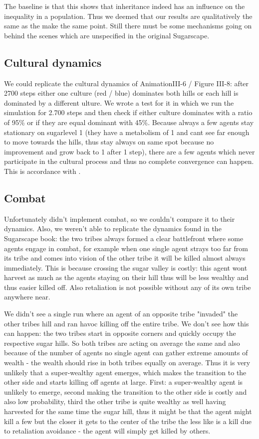 The baseline is that this shows that inheritance indeed has an influence on the inequality in a population. Thus we deemed that our results are qualitatively the same as the make the same point. Still there must be some mechanisms going on behind the scenes which are unspecified in the original Sugarscape.

\subsection{Cultural dynamics}
We could replicate the cultural dynamics of AnimationIII-6 / Figure III-8: after 2700 steps either one culture (red / blue) dominates both hills or each hill is dominated by a different ulture. We wrote a test for it in which we run the simulation for 2.700 steps and then check if either culture dominates with a ratio of 95\% or if they are equal dominant with 45\%. Because always a few agents stay stationary on sugarlevel 1 (they have a metabolism of 1 and cant see far enough to move towards the hills, thus stay always on same spot because no improvement and grow back to 1 after 1 step), there are a few agents which never participate in the cultural process and thus no complete convergence can happen. This is accordance with \cite{weaver_replicating_2009}.

\subsection{Combat}
Unfortunately \cite{weaver_replicating_2009} didn't implement combat, so we couldn't compare it to their dynamics. Also, we weren't able to replicate the dynamics found in the Sugarscape book: the two tribes always formed a clear battlefront where some agents engage in combat, for example when one single agent strays too far from its tribe and comes into vision of the other tribe it will be killed almost always immediately. This is because crossing the sugar valley is costly: this agent wont harvest as much as the agents staying on their hill thus will be less wealthy and thus easier killed off. Also retaliation is not possible without any of its own tribe anywhere near.

We didn't see a single run where an agent of an opposite tribe "invaded" the other tribes hill and ran havoc killing off the entire tribe. We don't see how this can happen: the two tribes start in opposite corners and quickly occupy the respective sugar hills. So both tribes are acting on average the same and also because of the number of agents no single agent can gather extreme amounts of wealth - the wealth should rise in both tribes equally on average. Thus it is very unlikely that a super-wealthy agent emerges, which makes the transition to the other side and starts killing off agents at large. First: a super-wealthy agent is unlikely to emerge, second making the transition to the other side is costly and also low probability, third the other tribe is quite wealthy as well having harvested for the same time the sugar hill, thus it might be that the agent might kill a few but the closer it gets to the center of the tribe the less like is a kill due to retaliation avoidance - the agent will simply get killed by others.

